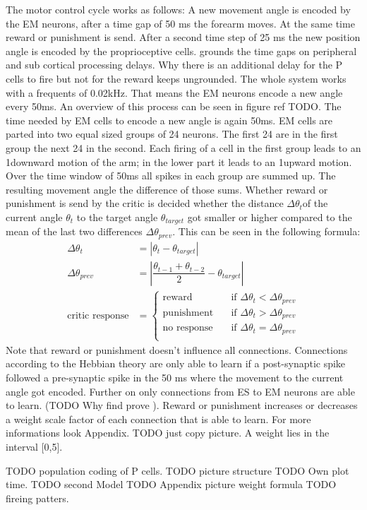 The motor control cycle works as follows: A new movement angle is encoded by the EM neurons, after a time gap of 50 ms the forearm moves. At the same time reward or punishment is send. After a second time step of 25 ms the new position angle is encoded by the proprioceptive cells. \cite{sebastianPaper} grounds the time gaps on peripheral and sub cortical processing delays. Why there is an additional delay for the P cells to fire but not for the reward keeps ungrounded. The whole system works with a frequents of 0.02kHz. That means the EM neurons encode a new angle every 50ms. An overview of this process can be seen in figure ref TODO.
The time needed by EM cells to encode a new angle is again 50ms. EM cells are parted into two equal sized groups of 24 neurons. The first 24 are in the first group the next 24 in the second. Each firing of a cell in the first group leads to an 1\degree  downward motion of the arm; in the lower part it leads to an 1\degree  upward motion. Over the time window of 50ms all spikes in each group are summed up. The resulting movement angle the difference of those sums.
Whether reward or punishment is send by the critic is decided whether the distance $\Delta\theta_t $of the current angle $\theta_t$  to the target angle $\theta_{target}$ got smaller or higher compared to the mean of the last two differences $\Delta\theta_{prev}$. This can be seen in the following formula:
\begin{align*}
	\Delta\theta_t &= |\theta_t-\theta_{target}|\\
	\Delta\theta_{prev} &= \left| \dfrac{\theta_{t-1}+\theta_{t-2}}{2} -\theta_{target}  \right |\\
	\text{critic response} &= 
	\begin{cases}
	\text{reward} &  \quad \text{if } \Delta\theta_t < \Delta\theta_{prev}\\
	\text{punishment}& \quad \text{if } \Delta\theta_t > \Delta\theta_{prev}\\
	\text{no response}& \quad \text{if } \Delta\theta_t = \Delta\theta_{prev}\\
	\end{cases}
\end{align*}
Note that reward or punishment doesn't influence all connections. Connections according to the Hebbian theory \cite{originalHebbianLaw} are only able to learn if a post-synaptic spike followed a pre-synaptic spike in the 50 ms where the movement to the current angle got encoded. Further on only connections from ES to EM neurons are able to learn. (TODO Why find prove ).  Reward or punishment increases or decreases a weight scale factor of each connection that is able to learn. For more informations look Appendix. TODO just copy picture.
A weight lies in the interval [0,5].

TODO population coding of P cells.
TODO picture structure
TODO Own plot time.
TODO second Model
TODO Appendix picture weight formula
TODO fireing patters.

